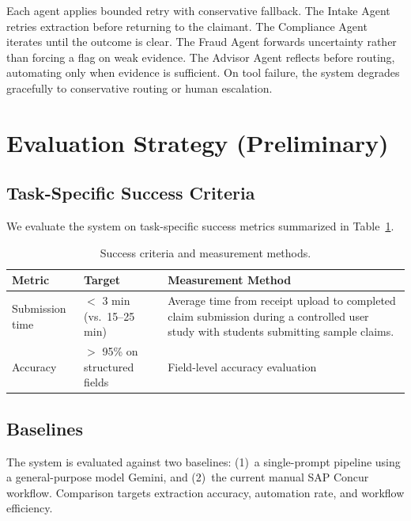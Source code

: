 \documentclass{article}
\begin{document}
Each agent applies bounded retry with conservative fallback. The Intake Agent retries extraction before returning to the claimant. The Compliance Agent iterates until the outcome is clear. The Fraud Agent forwards uncertainty rather than forcing a flag on weak evidence. The Advisor Agent reflects before routing, automating only when evidence is sufficient. On tool failure, the system degrades gracefully to conservative routing or human escalation.

\section{Evaluation Strategy (Preliminary)}
\label{sec:evaluation}

\subsection{Task-Specific Success Criteria}
\label{sec:success-criteria}

We evaluate the system on task-specific success metrics summarized in Table~\ref{tab:criteria}.

\begin{table}[!h]
  \centering
  \caption{Success criteria and measurement methods.}
  \label{tab:criteria}
  \small
  \begin{tabularx}{\textwidth}{@{}>{\raggedright\arraybackslash}p{1.5cm} >{\raggedright\arraybackslash}p{2.5cm} X@{}}
    \toprule
    \textbf{Metric} & \textbf{Target} & \textbf{Measurement Method} \\
    \midrule
    Submission time & $<$ 3 min (vs.\ 15--25 min) & Average time from receipt upload to completed claim submission during a controlled user study with students submitting sample claims. \\
    \addlinespace
    Accuracy & $>$ 95\% on structured fields & Field-level accuracy evaluation \\
    \bottomrule
  \end{tabularx}
\end{table}

\subsection{Baselines}
\label{sec:baselines}

The system is evaluated against two baselines: (1)~a single-prompt pipeline using a general-purpose model Gemini, and (2)~the current manual SAP Concur workflow. Comparison targets extraction accuracy, automation rate, and workflow efficiency.
\end{document}
